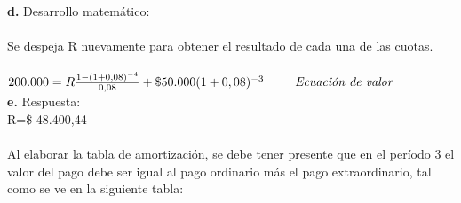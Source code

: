 \textbf{d.} Desarrollo matemático:\\\\
Se despeja R nuevamente para obtener el resultado de cada una de las cuotas.\\\\
$200.000=R \frac{1-(1+0,08)^{-4}}{0,08}+\$50.000 (1+0,08)^{-3} \hspace{25 pt} \textit{Ecuación de valor}$\\

\textbf{e.} Respuesta:\\
	R=\$ 48.400,44 \\\\
Al elaborar la tabla de amortización, se debe tener presente que en el período 3 el valor del pago debe ser igual al pago ordinario más el pago extraordinario, tal como se ve en la siguiente tabla:

